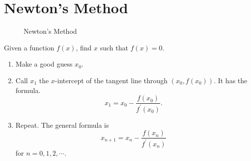 \section{Newton's Method}
\begin{figure}[H]
    \centering
    \caption{Newton's Method}
\end{figure}
Given a function $f(x)$, find $x$ such that $f(x)=0$.
\begin{enumerate}
    \item Make a good guess $x_0$.
    \item Call $x_1$ the $x$-intercept of the tangent line through $(x_0, f(x_0))$. It has the formula.
        $$
        \boxed{x_1=x_0-\frac{f(x_0)}{f^\prime(x_0)}.}
        $$
    \item Repeat. The general formula is
        $$
        \boxed{x_{n+1}=x_n-\frac{f(x_n)}{f^\prime(x_n)}}
        $$
        for $n=0,1,2,\cdots$.
\end{enumerate}
